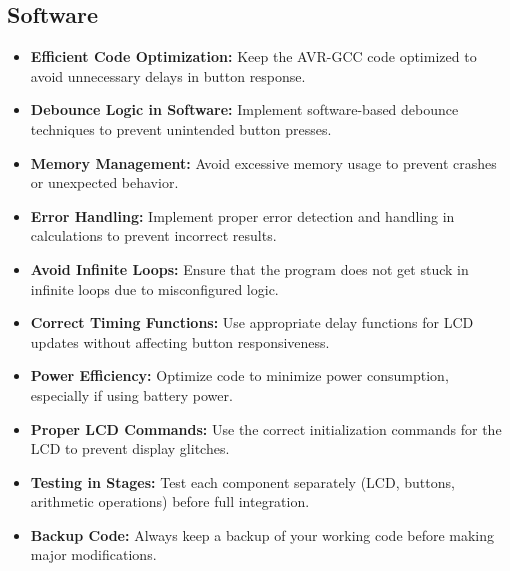 \documentclass[a4paper,12pt]{article}
\theoremstyle{remark}
\begin{document}
\subsection{Software}
\begin{itemize}
    \item \textbf{Efficient Code Optimization:} Keep the AVR-GCC code optimized to avoid unnecessary delays in button response.
    \item \textbf{Debounce Logic in Software:} Implement software-based debounce techniques to prevent unintended button presses.
    \item \textbf{Memory Management:} Avoid excessive memory usage to prevent crashes or unexpected behavior.
    \item \textbf{Error Handling:} Implement proper error detection and handling in calculations to prevent incorrect results.
     \item \textbf{Avoid Infinite Loops:} Ensure that the program does not get stuck in infinite loops due to misconfigured logic.
    \item \textbf{Correct Timing Functions:} Use appropriate delay functions for LCD updates without affecting button responsiveness.
    \item \textbf{Power Efficiency:} Optimize code to minimize power consumption, especially if using battery power.
    \item \textbf{Proper LCD Commands:} Use the correct initialization commands for the LCD to prevent display glitches.
    \item \textbf{Testing in Stages:} Test each component separately (LCD, buttons, arithmetic operations) before full integration.
    \item \textbf{Backup Code:} Always keep a backup of your working code before making major modifications.
\end{itemize}
\end{document}
